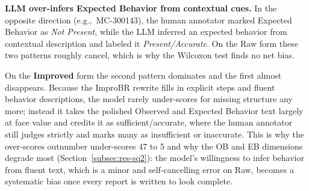 \textbf{LLM over-infers Expected Behavior from contextual cues.} In the opposite
direction (e.g.,\ MC-300143), the human annotator marked Expected Behavior as
\emph{Not Present}, while the LLM inferred an expected behavior from contextual
description and labeled it \emph{Present/Accurate}. On the Raw form these two
patterns roughly cancel, which is why the Wilcoxon test finds no net bias.

On the \textbf{Improved} form the second pattern dominates and the first almost
disappears. Because the ImproBR rewrite fills in explicit steps and fluent
behavior descriptions, the model rarely under-scores for missing structure any
more; instead it takes the polished Observed and Expected Behavior text largely
at face value and credits it as sufficient/accurate, where the human annotator
still judges strictly and marks many as insufficient or inaccurate. This is why
the over-scores outnumber under-scores 47 to 5 and why the OB and EB dimensions
degrade most (Section~\ref{subsec:res-sq2}): the model's willingness to infer
behavior from fluent text, which is a minor and self-cancelling error on Raw,
becomes a systematic bias once every report is written to look complete.
